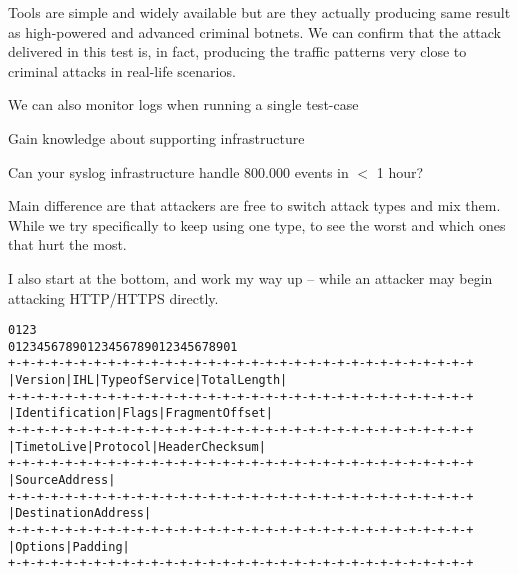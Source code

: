 \documentclass[Screen16to9,17pt]{foils}
\begin{document}

Tools are simple and widely available but are they actually producing same result as high-powered and advanced criminal botnets. We can confirm that the attack delivered in this test is, in fact, producing the traffic patterns very close to criminal attacks in real-life scenarios.

\begin{list2}
\item We can also monitor logs when running a single test-case
\item Gain knowledge about supporting infrastructure
\item Can your syslog infrastructure handle 800.000 events in $<$ 1 hour?
\end{list2}

Main difference are that attackers are free to switch attack types and mix them. While we try specifically to keep using one type, to see the worst and which ones that hurt the most.

I also start at the bottom, and work my way up -- while an attacker may begin attacking HTTP/HTTPS directly.







\begin{alltt}\footnotesize
0                   1                   2                   3
0 1 2 3 4 5 6 7 8 9 0 1 2 3 4 5 6 7 8 9 0 1 2 3 4 5 6 7 8 9 0 1
+-+-+-+-+-+-+-+-+-+-+-+-+-+-+-+-+-+-+-+-+-+-+-+-+-+-+-+-+-+-+-+-+
|Version|  IHL  |Type of Service|          Total Length         |
+-+-+-+-+-+-+-+-+-+-+-+-+-+-+-+-+-+-+-+-+-+-+-+-+-+-+-+-+-+-+-+-+
|         Identification        |Flags|      Fragment Offset    |
+-+-+-+-+-+-+-+-+-+-+-+-+-+-+-+-+-+-+-+-+-+-+-+-+-+-+-+-+-+-+-+-+
|  Time to Live |    Protocol   |         Header Checksum       |
+-+-+-+-+-+-+-+-+-+-+-+-+-+-+-+-+-+-+-+-+-+-+-+-+-+-+-+-+-+-+-+-+
|                       Source Address                          |
+-+-+-+-+-+-+-+-+-+-+-+-+-+-+-+-+-+-+-+-+-+-+-+-+-+-+-+-+-+-+-+-+
|                    Destination Address                        |
+-+-+-+-+-+-+-+-+-+-+-+-+-+-+-+-+-+-+-+-+-+-+-+-+-+-+-+-+-+-+-+-+
|                    Options                    |    Padding    |
+-+-+-+-+-+-+-+-+-+-+-+-+-+-+-+-+-+-+-+-+-+-+-+-+-+-+-+-+-+-+-+-+
\end{alltt}
\end{document}
